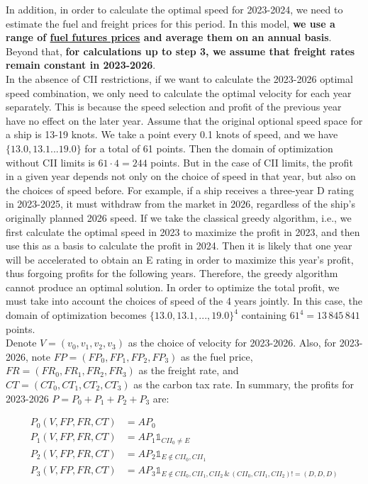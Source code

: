 \documentclass[a4paper,12pt]{article}
\begin{document}
In addition, in order to calculate the optimal speed for 2023-2024, we need to estimate the fuel and freight prices for this period.
In this model, \textbf{we use a range of \href{https://www.cmegroup.com/markets/energy/refined-products/singapore-380cst-fuel-oil-platts-swap-futures.html}{fuel futures prices} and average them on an annual basis}.
Beyond that, \textbf{for calculations up to step 3, we assume that freight rates remain constant in 2023-2026}.\\


In the absence of CII restrictions, if we want to calculate the 2023-2026 optimal speed combination, we only need to calculate the optimal velocity for each year separately.
This is because the speed selection and profit of the previous year have no effect on the later year.
Assume that the original optional speed space for a ship is 13-19 knots.
We take a point every 0.1 knots of speed, and we have $\{13.0, 13.1 ... 19.0\}$ for a total of 61 points.
Then the domain of optimization without CII limits is $61 \cdot 4 = 244$ points.
But in the case of CII limits, the profit in a given year depends not only on the choice of speed in that year, but also on the choices of speed before.
For example, if a ship receives a three-year D rating in 2023-2025, it must withdraw from the market in 2026, regardless of the ship's originally planned 2026 speed.
If we take the classical greedy algorithm, i.e., we first calculate the optimal speed in 2023 to maximize the profit in 2023, and then use this as a basis to calculate the profit in 2024.
Then it is likely that one year will be accelerated to obtain an E rating in order to maximize this year's profit, thus forgoing profits for the following years.
Therefore, the greedy algorithm cannot produce an optimal solution.
In order to optimize the total profit, we must take into account the choices of speed of the 4 years jointly.
In this case, the domain of optimization becomes $\{13.0, 13.1, ..., 19.0\}^4$ containing $61^4 = 13 \,845 \,841$ points.\\



Denote $V = (v_0, v_1, v_2, v_3)$ as the choice of velocity for 2023-2026.
Also, for 2023-2026, note $FP=(FP_0, FP_1,FP_2,FP_3)$ as the fuel price, $FR=(FR_0,FR_1,FR_2,FR_3)$ as the freight rate, and $CT=(CT_0, CT_1, CT_2, CT_3)$ as the carbon tax rate.
In summary, the profits for 2023-2026 $P=P_0+P_1+P_2+P_3$ are:

\begin{align}
	\label{eq:P}
	P_0(V, FP, FR, CT ) & = AP_0                                                                                   \\
	P_1(V, FP, FR, CT ) & = AP_1 \mathds{1} _{CII_0 \neq E}                                                        \\
	P_2(V, FP, FR, CT ) & = AP_2 \mathds{1} _{E \notin {CII_0, CII_1}}                                             \\
	P_3(V, FP, FR, CT ) & = AP_3 \mathds{1} _{E \notin {CII_0, CII_1, CII_2}\,\&\, (CII_0, CII_1, CII_2)!=(D,D,D)}
\end{align}
\end{document}
